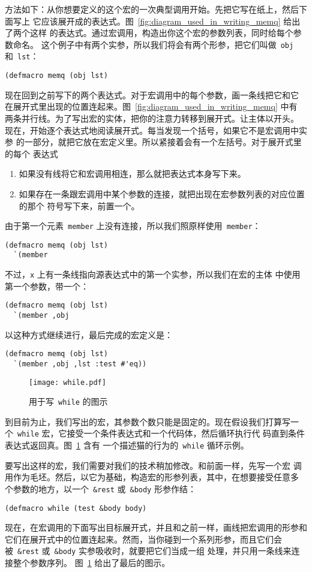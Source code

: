 方法如下：从你想要定义的这个宏的一次典型调用开始。先把它写在纸上，然后下面写上
它应该展开成的表达式。图~\ref{fig:diagram_used_in_writing_memq} 给出了两个这样
的表达式。通过宏调用，构造出你这个宏的参数列表，同时给每个参数命名。
这个例子中有两个实参，所以我们将会有两个形参，把它们叫做~\verb|obj|
和~\verb|lst|：
\begin{lstlisting}
(defmacro memq (obj lst)
\end{lstlisting}
现在回到之前写下的两个表达式。对于宏调用中的每个参数，画一条线把它和它
在展开式里出现的位置连起来。图~\ref{fig:diagram_used_in_writing_memq} 中有
两条并行线。为了写出宏的实体，把你的注意力转移到展开式。让主体以\bq{}开头。
现在，开始逐个表达式地阅读展开式。每当发现一个括号，如果它不是宏调用中实参
的一部分，就把它放在宏定义里。所以紧接着\bq{}会有一个左括号。对于展开式里的每个
表达式
\begin{enumerate}
\item 如果没有线将它和宏调用相连，那么就把表达式本身写下来。
\item 如果存在一条跟宏调用中某个参数的连接，就把出现在宏参数列表的对应位置的那个
  符号写下来，前置一个\comma{}。
\end{enumerate}
由于第一个元素~\verb|member| 上没有连接，所以我们照原样使用~\verb|member|：
\begin{lstlisting}
(defmacro memq (obj lst)
  `(member
\end{lstlisting}
不过，\verb|x| 上有一条线指向源表达式中的第一个实参，所以我们在宏的主体
中使用第一个参数，带一个\comma{}：
\begin{lstlisting}
(defmacro memq (obj lst)
  `(member ,obj
\end{lstlisting}
以这种方式继续进行，最后完成的宏定义是：
\begin{lstlisting}
(defmacro memq (obj lst)
  `(member ,obj ,lst :test #'eq))
\end{lstlisting}

\begin{figure}
\texttt{[image: while.pdf]}
\caption{\label{fig:diagram_used_in_writing_while}用于写~\texttt{while} 的图示}
\end{figure}

到目前为止，我们写出的宏，其参数个数只能是固定的。现在假设我们打算写一
个~\verb|while| 宏，它接受一个条件表达式和一个代码体，然后循环执行代
码直到条件表达式返回真。图~\ref{fig:diagram_used_in_writing_while} 含有
一个描述猫的行为的~\verb|while| 循环示例。

要写出这样的宏，我们需要对我们的技术稍加修改。和前面一样，先写一个宏
调用作为毛坯。然后，以它为基础，构造宏的形参列表，其中，在想要接受任意多
个参数的地方，以一个~\verb|&rest| 或~\verb|&body| 形参作结：
\begin{lstlisting}
(defmacro while (test &body body)
\end{lstlisting}
现在，在宏调用的下面写出目标展开式，并且和之前一样，画线把宏调用的形参和
它们在展开式中的位置连起来。然而，当你碰到一个系列形参，而且它们会
被~\verb|&rest| 或~\verb|&body| 实参吸收时，就要把它们当成一组
处理，并只用一条线来连接整个参数序列。
图~\ref{fig:diagram_used_in_writing_while} 给出了最后的图示。

